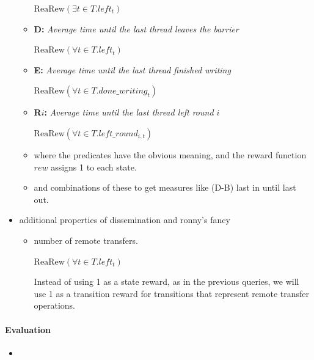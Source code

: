 \documentclass[a4paper, 10pt]{article}
\begin{document}
\begin{itemize}
\begin{itemize}
				\begin{center}
					$\mathrm{ReaRew}(\exists t \in T . \mathit{left_t} )$
				\end{center}
			\item \textbf{D:} \emph{Average time until the last thread leaves the barrier}
				\begin{center}
					$\mathrm{ReaRew}(\forall t \in T . \mathit{left_t} )$
				\end{center}
			\item \textbf{E:} \emph{Average time until the last thread finished writing}
				\begin{center}
					$\mathrm{ReaRew}(\forall t \in T . \mathit{done\_writing_t} )$
				\end{center}
			\item \textbf{R$i$:} \emph{Average time until the last thread left round $i$}
				\begin{center}
					$\mathrm{ReaRew}(\forall t \in T . \mathit{left\_round_{i,t}} )$
				\end{center}
			\item where the predicates have the obvious meaning, and the reward function $\mathit{rew}$ assigns 1 to each state.
			\item and combinations of these to get measures like (D-B) last in until last out.
		\end{itemize}
	\item additional properties of dissemination and ronny's fancy
		\begin{itemize}
			\item number of remote transfers.
				\begin{center}
					$\mathrm{ReaRew}(\forall t \in T . \mathit{left_t} )$
				\end{center}
				Instead of using 1 as a state reward, as in the previous queries, we will use 1 as a transition reward for transitions that represent remote transfer operations.
		\end{itemize}
\end{itemize}

\paragraph{Evaluation}
\label{ssssec:analysis-modelchecking-quantitative-properties-results}
\begin{itemize}
	\item 
\end{itemize}
\end{document}
